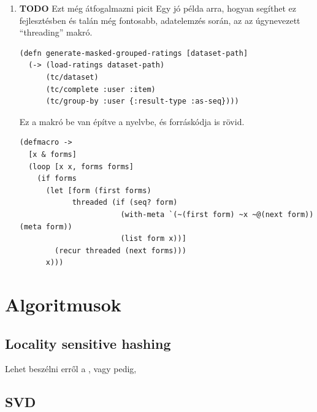 \documentclass[final, 12pt] {ubb_dolgozat}{book}
\begin{document}
\begin{enumerate}
\item {\bfseries\sffamily TODO} Ezt még átfogalmazni picit
\label{sec:org91f5f97}
Egy jó példa arra, hogyan segíthet ez fejlesztésben és talán még fontosabb, adatelemzés során, az az úgynevezett ``threading'' makró.

\begin{verbatim}
(defn generate-masked-grouped-ratings [dataset-path]
  (-> (load-ratings dataset-path)
      (tc/dataset)
      (tc/complete :user :item)
      (tc/group-by :user {:result-type :as-seq})))
\end{verbatim}

Ez a makró be van építve a nyelvbe, és forráskódja is rövid.

\begin{verbatim}
(defmacro ->
  [x & forms]
  (loop [x x, forms forms]
    (if forms
      (let [form (first forms)
            threaded (if (seq? form)
                       (with-meta `(~(first form) ~x ~@(next form)) (meta form))
                       (list form x))]
        (recur threaded (next forms)))
      x)))
\end{verbatim}
\end{enumerate}

\chapter{Algoritmusok}
\label{sec:org92a14c3}
\section{Locality sensitive hashing}
\label{sec:orge4d1368}
Lehet beszélni erről a \citep{charikarSimilarityEstimationTechniques}, vagy pedig,

\section{SVD}
\label{sec:org27215df}
\citep{brandFastOnlineSVD2003}



\end{document}
